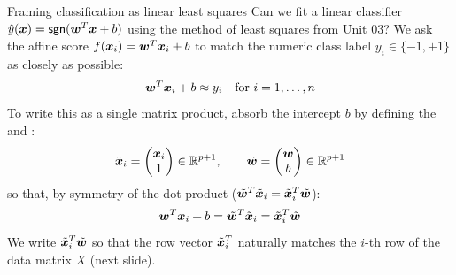 \documentclass[aspectratio=169]{beamer}\usepackage[]{graphicx}\usepackage[]{xcolor}
\begin{document}



\begin{frame}{Framing classification as linear least squares}
    Can we fit a linear classifier $\hat{y}(\bm{x}) = \mathsf{sgn}(\bm{w}^T \bm{x} + b)$ using the method of least squares from Unit 03?
    \vfill
    We ask the affine score $f(\bm{x}_i) = \bm{w}^T \bm{x}_i + b$ to match the numeric class label $y_i \in \{-1, +1\}$ as closely as possible:
    \[
        \bm{w}^T \bm{x}_i + b \approx y_i \quad \text{for } i = 1, \ldots, n
    \]
    \vfill
    To write this as a single matrix product, absorb the intercept $b$ by defining the  and :
    \[
        \tilde{\bm{x}}_i = \begin{pmatrix} \bm{x}_i \\ 1 \end{pmatrix} \in \mathbb{R}^{p+1}, \qquad \tilde{\bm{w}} = \begin{pmatrix} \bm{w} \\ b \end{pmatrix} \in \mathbb{R}^{p+1}
    \]
    so that, by symmetry of the dot product ($\tilde{\bm{w}}^T \tilde{\bm{x}}_i = \tilde{\bm{x}}_i^T \tilde{\bm{w}}$):
    \[
        \bm{w}^T \bm{x}_i + b = \tilde{\bm{w}}^T \tilde{\bm{x}}_i = \tilde{\bm{x}}_i^T \tilde{\bm{w}}
    \]
    We write $\tilde{\bm{x}}_i^T \tilde{\bm{w}}$ so that the row vector $\tilde{\bm{x}}_i^T$ naturally matches the $i$-th row of the data matrix $X$ (next slide).
\end{frame}
\end{document}
